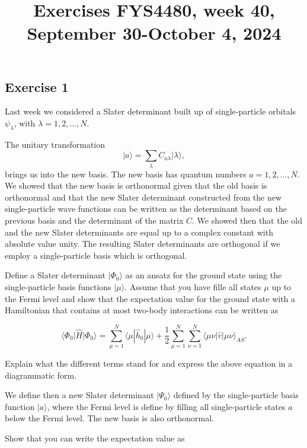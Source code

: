 \documentclass[prc]{revtex4}
\begin{document}
\title{Exercises FYS4480, week 40, September 30-October 4, 2024}
\maketitle



\subsection*{Exercise 1}

Last week we considered a Slater determinant built up of
single-particle orbitals $\psi_{\lambda}$, with $\lambda =
1,2,\dots,N$.

The unitary transformation
\[
\vert a\rangle  = \sum_{\lambda} C_{a\lambda}\vert \lambda\rangle,
\]
brings us into the new basis.  The new basis has quantum numbers
$a=1,2,\dots,N$.  We showed that the new basis is orthonormal given
that the old basis is orthonormal and that the new Slater determinant
constructed from the new single-particle wave functions can be written
as the determinant based on the previous basis and the determinant of
the matrix $C$.  We showed then that the old and the new Slater
determinants are equal up to a complex constant with absolute value
unity.  The resulting Slater determinants are orthogonal if we employ
a single-particle basis which is orthogonal.

Define a Slater determinant $\vert\Phi_0\rangle$ as an ansatz for the ground state
using the single-particle basis functions $\vert\mu\rangle$.  Assume
that you have fille all states $\mu$ up to the Fermi level and show
that the expectation value for the ground state with a Hamiltonian
that contains at most two-body interactions can be written as

\[
 \langle \Phi_0 \vert \hat{H}\vert \Phi_0\rangle 
  = \sum_{\mu=1}^N \langle \mu | \hat{h}_0 | \mu \rangle +
  \frac{1}{2}\sum_{{\mu}=1}^N\sum_{{\nu}=1}^N \langle \mu\nu|\hat{v}|\mu\nu\rangle_{AS}.
\]

Explain what the different terms stand for and express the above
equation in a diagrammatic form.

We define then a new Slater determinant $\vert\Psi_0\rangle$ defined by the
single-particle basis function $\vert a\rangle$, where the Fermi level is
define by filling all single-particle states $a$ below the Fermi level. The new basis is also orthonormal.

Show that you can write the expectation value as
\end{document}
